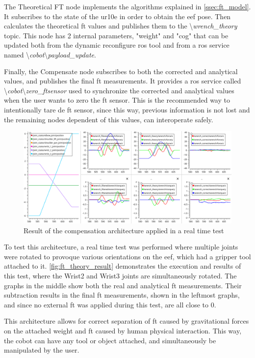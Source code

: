\par The Theoretical FT node implements the algorithms explained in \autoref{ssec:ft_model}. It subscribes to the state of the \ac{ur10e} in order to obtain the \ac{eef} pose. Then calculates the theoretical \ac{ft} values and publishes them to the \textbackslash\textit{wrench\_theory} topic. This node has 2 internal parameters, "weight" and "cog" that can be updated both from the dynamic reconfigure \ac{ros} tool and from a \ac{ros} service named \textbackslash\textit{cobot}\textbackslash\textit{payload\_update}.
\par Finally, the Compensate node subscribes to both the corrected and analytical values, and publishes the final \ac{ft} measurements. It provides a \ac{ros} service called \textbackslash \textit{cobot}\textbackslash\textit{zero\_ftsensor} used to synchronize the corrected and analytical values when the user wants to zero the \ac{ft} sensor. This is the recommended way to intentionally tare de \ac{ft} sensor, since this way, previous information is not lost and the remaining nodes dependent of this values, can interoperate safely.

\begin{figure}[h]
    \centering
    \includegraphics[width=0.9\linewidth]{figs/chp3/ft_sensor_theory_result.png}
    \caption{Result of the compensation architecture applied in a real time test}
    \label{fig:ft_theory_result}
\end{figure}

\par To test this architecture, a real time test was performed where multiple joints were rotated to provoque various orientations on the \ac{eef}, which had a gripper tool attached to it. \autoref{fig:ft_theory_result} demonstrates the execution and results of this test, where the Wrist2 and Wrist3 joints are simultaneously rotated. The graphs in the middle show both the real and analytical \ac{ft} measurements. Their subtraction results in the final \ac{ft} measurements, shown in the leftmost graphs, and since no external \ac{ft} was applied during this test, are all close to 0.
\par This architecture allows for correct separation of \ac{ft} caused by gravitational forces on the attached weight and \ac{ft} caused by human physical interaction. This way, the cobot can have any tool or object attached, and simultaneously be manipulated by the user.

